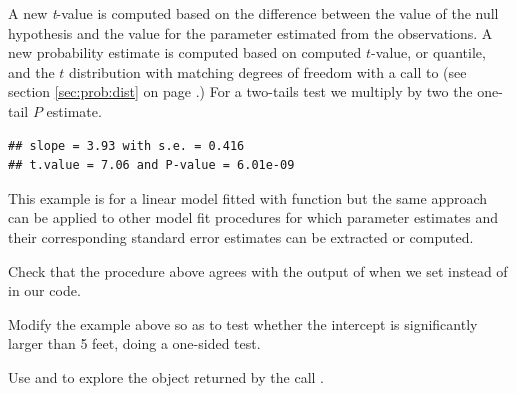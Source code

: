 \documentclass[krantz2]{krantz}\usepackage{knitr}
\begin{document}
\begin{advplayground}
A new \emph{t}-value is computed based on the difference between the value of the null hypothesis and the value for the parameter estimated from the observations. A new probability estimate is computed based on computed $t$-value, or quantile, and the $t$ distribution with matching degrees of freedom with a call to  (see section \ref{sec:prob:dist} on page \pageref{sec:prob:dist}.) For a two-tails test we multiply by two the one-tail $P$ estimate.

\begin{knitrout}\footnotesize
{}\color{fgcolor}\begin{kframe}
\begin{alltt}
 \hlkwb{<-} 
 \hlkwb{<-}  \hlopt{-}  \hlopt{/} 
 \hlkwb{<-}  \hlopt{*} \hlstd{(}     \hlstd{=} \hlstd{)}
\hlstd{(}\hlstd{,}  \hlstd{),} \hlstd{,}  \hlstd{),}
    \hlstd{,}  \hlstd{),} \hlstd{,}  \hlstd{))}
\end{alltt}
\begin{verbatim}
## slope = 3.93 with s.e. = 0.416 
## t.value = 7.06 and P-value = 6.01e-09
\end{verbatim}
\end{kframe}
\end{knitrout}

This example is for a linear model fitted with function  but the same approach can be applied to other model fit procedures for which parameter estimates and their corresponding standard error estimates can be extracted or computed.

Check that the procedure above agrees with the output of  when we set  instead of  in our code.

Modify the example above so as to test whether the intercept is significantly larger than 5 feet, doing a one-sided test.

Use  and  to explore the \Rlang object returned by the call .

\end{advplayground}
\end{document}
